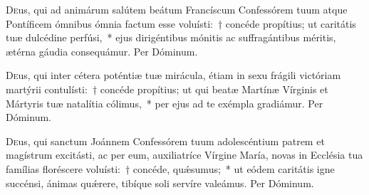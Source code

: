 \documentclass[vesperale_romanum.tex]{subfiles}
\begin{document}
\capitdeseq

\myrule

\newpage
{}

\duplexmtv


\oratio

\lettrine{D}{e}us, qui ad animárum salútem beátum Francíscum Confessórem tuum atque Pontíficem ómnibus ómnia factum esse voluísti:~† concéde propítius; ut caritátis tuæ dulcédine perfúsi,~* ejus dirigéntibus mónitis ac suffragántibus méritis, ætérna gáudia consequámur.
Per Dóminum.


\commsequentis

\myrule
{}

\semiduplex


\oratio

\lettrine{D}{e}us, qui inter cétera poténtiæ tuæ mirácula, étiam in sexu frágili victóriam martýrii contulísti:~† concéde propítius; ut qui beatæ Martínæ Vírginis et Mártyris tuæ natalítia cólimus,~* per ejus ad te exémpla gradiámur. Per Dóminum.





\vespsequentiscomm

\myrule
\newpage


\duplex

\oratio

\lettrine{D}{e}us, qui sanctum Joánnem Confessórem tuum adolescéntium patrem et magístrum excitásti, ac per eum, auxiliatríce Vírgine María, novas in Ecclésia tua famílias floréscere voluísti:~† concéde, quǽsumus;~* ut eódem caritátis igne succénsi, ánimas quǽrere, tibíque soli servíre valeámus.
Per Dóminum.
 

\capitdeseq

\myrule
\end{document}

